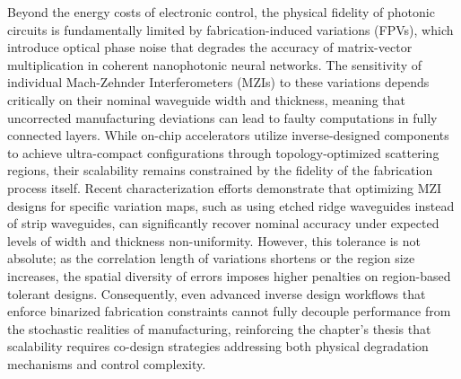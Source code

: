 \documentclass[11pt]{article}
\begin{document}
Beyond the energy costs of electronic control, the physical fidelity of photonic circuits is fundamentally limited by fabrication-induced variations (FPVs), which introduce optical phase noise that degrades the accuracy of matrix-vector multiplication in coherent nanophotonic neural networks. The sensitivity of individual Mach-Zehnder Interferometers (MZIs) to these variations depends critically on their nominal waveguide width and thickness, meaning that uncorrected manufacturing deviations can lead to faulty computations in fully connected layers. While on-chip accelerators utilize inverse-designed components to achieve ultra-compact configurations through topology-optimized scattering regions, their scalability remains constrained by the fidelity of the fabrication process itself. Recent characterization efforts demonstrate that optimizing MZI designs for specific variation maps, such as using etched ridge waveguides instead of strip waveguides, can significantly recover nominal accuracy under expected levels of width and thickness non-uniformity. However, this tolerance is not absolute; as the correlation length of variations shortens or the region size increases, the spatial diversity of errors imposes higher penalties on region-based tolerant designs. Consequently, even advanced inverse design workflows that enforce binarized fabrication constraints cannot fully decouple performance from the stochastic realities of manufacturing, reinforcing the chapter's thesis that scalability requires co-design strategies addressing both physical degradation mechanisms and control complexity. \citep{doi_10_1109_tnano_2022_3223915_d4da3e6b} \citep{doi_10_1038_s41467_026_68648_1_26658a9c}
\end{document}
